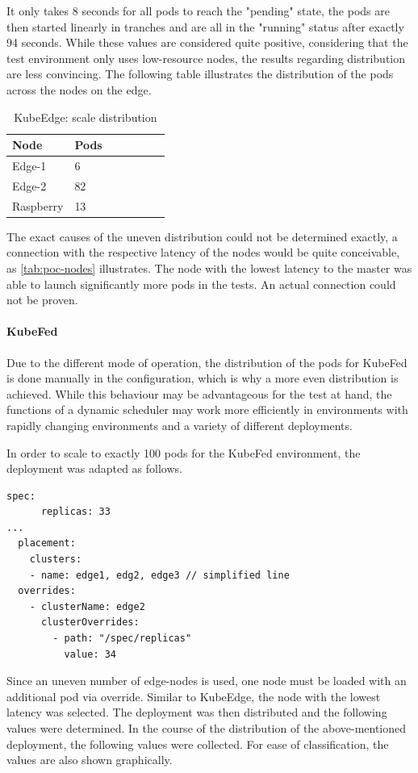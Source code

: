 \documentclass[MSC,Master,english]{twbook}%
\begin{document}
It only takes 8 seconds for all pods to reach the "pending" state, the pods are then started linearly in tranches and are all in the "running" status after exactly 94 seconds. While these values are considered quite positive, considering that the test environment only uses low-resource nodes, the results regarding distribution are less convincing. The following table illustrates the distribution of the pods across the nodes on the edge.

\begin{table}[ht]
    \begin{center}
        \begin{tabular}{|l|l|l|l|l|l|l|}
            \hline
            Node & Pods \\
            \hline
            Edge-1 & 6 \\
            Edge-2 & 82 \\
            Raspberry & 13 \\
            \hline
        \end{tabular}
        \caption{KubeEdge: scale distribution}
        \label{tab:ke-scale-distribution}
    \end{center}
\end{table}

The exact causes of the uneven distribution could not be determined exactly, a connection with the respective latency of the nodes would be quite conceivable, as \autoref{tab:poc-nodes} illustrates. The node with the lowest latency to the master was able to launch significantly more pods in the tests. An actual connection could not be proven.

\paragraph{KubeFed} Due to the different mode of operation, the distribution of the pods for KubeFed is done manually in the configuration, which is why a more even distribution is achieved. While this behaviour may be advantageous for the test at hand, the functions of a dynamic scheduler may work more efficiently in environments with rapidly changing environments and a variety of different deployments. \par
In order to scale to exactly 100 pods for the KubeFed environment, the deployment was adapted as follows.
\vspace{\baselineskip}
\begin{lstlisting}[caption={KubeFed scale adaptations},captionpos=b]
    spec:
      replicas: 33
...
  placement:
    clusters:
    - name: edge1, edg2, edge3 // simplified line
  overrides:
    - clusterName: edge2
      clusterOverrides:
        - path: "/spec/replicas"
          value: 34
\end{lstlisting}
\par
Since an uneven number of edge-nodes is used, one node must be loaded with an additional pod via override. Similar to KubeEdge, the node with the lowest latency was selected. The deployment was then distributed and the following values were determined. In the course of the distribution of the above-mentioned deployment, the following values were collected. For ease of classification, the values are also shown graphically.
\end{document}
